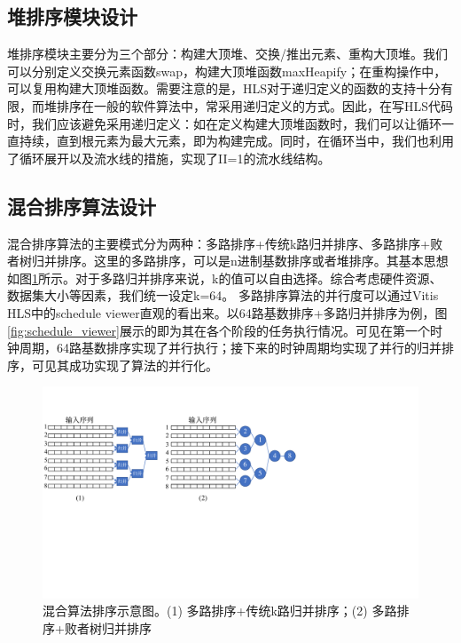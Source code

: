 \subsection{堆排序模块设计}
堆排序模块主要分为三个部分：构建大顶堆、交换/推出元素、重构大顶堆。我们可以分别定义交换元素函数swap，构建大顶堆函数maxHeapify；在重构操作中，可以复用构建大顶堆函数。需要注意的是，HLS对于递归定义的函数的支持十分有限，而堆排序在一般的软件算法中，常采用递归定义的方式。因此，在写HLS代码时，我们应该避免采用递归定义：如在定义构建大顶堆函数时，我们可以让循环一直持续，直到根元素为最大元素，即为构建完成。同时，在循环当中，我们也利用了循环展开以及流水线的措施，实现了II=1的流水线结构。

\subsection{混合排序算法设计}


混合排序算法的主要模式分为两种：多路排序+传统k路归并排序、多路排序+败者树归并排序。这里的多路排序，可以是n进制基数排序或者堆排序。其基本思想如图\ref{fig:k_way_sorting}所示。对于多路归并排序来说，k的值可以自由选择。综合考虑硬件资源、数据集大小等因素，我们统一设定k=64。
多路排序算法的并行度可以通过Vitis HLS中的schedule viewer直观的看出来。以64路基数排序+多路归并排序为例，图\ref{fig:schedule_viewer}展示的即为其在各个阶段的任务执行情况。可见在第一个时钟周期，64路基数排序实现了并行执行；接下来的时钟周期均实现了并行的归并排序，可见其成功实现了算法的并行化。


\begin{figure}[htbp]
    \centering
    \includegraphics[width=\linewidth]{figures/k_way_sorting.pdf}
    \caption{混合算法排序示意图。(1) 多路排序+传统k路归并排序；(2) 多路排序+败者树归并排序}
    \label{fig:k_way_sorting}
\end{figure}


